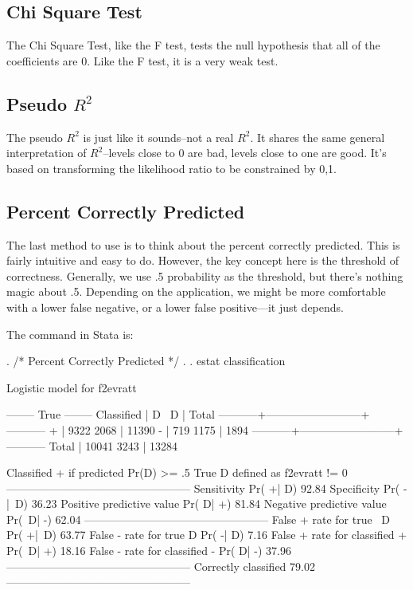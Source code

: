 \documentclass[12pt]{article}
\begin{document}
\subsection{Chi Square Test}

The Chi Square Test, like the F test, tests the null hypothesis that
all of the coefficients are 0. Like the F test, it is  a very weak
test. 

\subsection{Pseudo $R^2$}

The pseudo $R^2$ is just like it sounds--not a real $R^2$. It shares
the same general interpretation of $R^2$--levels close to 0 are bad,
levels close to one are good. It's based on transforming the
likelihood ratio to be constrained by 0,1. 

\subsection{Percent Correctly Predicted}

The last method to use is to think about the percent correctly
predicted. This is fairly intuitive and easy to do. However, the key
concept here is the threshold of correctness. Generally, we use .5
probability as the threshold, but there's nothing magic about
.5. Depending on the application, we might be more comfortable with a
lower false negative, or a lower false positive---it just depends. 

The command in Stata is:


\begin{stlog}

. /* Percent Correctly Predicted  */
. 
. estat classification

Logistic model for f2evratt

              -------- True --------
Classified |         D            ~D  |      Total
-----------+--------------------------+-----------
     +     |      9322          2068  |      11390
     -     |       719          1175  |       1894
-----------+--------------------------+-----------
   Total   |     10041          3243  |      13284

Classified + if predicted Pr(D) >= .5
True D defined as f2evratt != 0
--------------------------------------------------
Sensitivity                     Pr( +| D)   92.84%
Specificity                     Pr( -|~D)   36.23%
Positive predictive value       Pr( D| +)   81.84%
Negative predictive value       Pr(~D| -)   62.04%
--------------------------------------------------
False + rate for true ~D        Pr( +|~D)   63.77%
False - rate for true D         Pr( -| D)    7.16%
False + rate for classified +   Pr(~D| +)   18.16%
False - rate for classified -   Pr( D| -)   37.96%
--------------------------------------------------
Correctly classified                        79.02%
--------------------------------------------------


\end{stlog}
\end{document}
